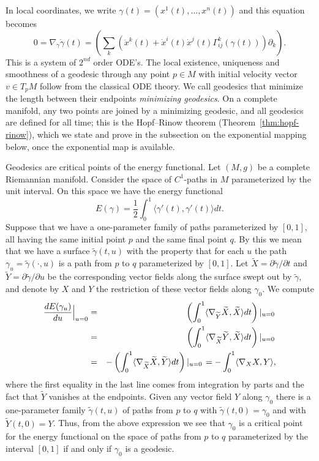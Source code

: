 In local coordinates, we write $\gamma(t)=(x^1(t),\ldots,x^n(t))$
and this equation becomes
$$0=\nabla_{\dot \gamma}\dot \gamma(t) =
\left(\sum\limits_k\left(\ddot x^k(t) +\dot x^i(t)\dot
x^j(t)\Gamma^{k}_{ij}(\gamma(t))\right)\partial_k\right).$$ This is
a system of $2^{nd}$ order ODE's. The local existence, uniqueness
and smoothness of a geodesic through any point $p\in M$ with initial
velocity vector $v\in T_pM$ follow from the classical ODE theory.
We call geodesics that minimize the length between their endpoints
{\em minimizing geodesics}. On a complete manifold, any two points
are joined by a minimizing geodesic, and all geodesics are defined
for all time; this is the Hopf--Rinow theorem
(Theorem~\ref{thm:hopf-rinow}), which we state and prove in the
subsection on the exponential mapping below, once the exponential
map is available.


Geodesics are critical points of the energy functional. Let $(M,g)$
be a complete Riemannian manifold. Consider the space of $C^1$-paths
in $M$ parameterized by the unit interval. On this space we have the
energy functional
$$E(\gamma)=\frac{1}{2}\int_{0}^{1}\langle \gamma'(t),\gamma'(t)\rangle dt.$$
 Suppose that we have a one-parameter family of  paths parameterized by
 $[0,1]$,
 all having the same initial point $p$ and the same final point $q$.
 By this we mean that we have a surface $\tilde\gamma(t,u)$ with the property that for each
 $u$ the path $\gamma_u=\tilde\gamma(\cdot,u)$ is a path from $p$ to $q$ parameterized by $[0,1]$.
 Let $\widetilde X=\partial\tilde \gamma/\partial t$ and
 $\widetilde Y=\partial\tilde \gamma/\partial u$ be the corresponding vector
 fields along the surface swept out by $\tilde \gamma$, and denote by $X$ and $Y$ the restriction
 of these vector fields along $\gamma_0$.
 We compute
 \begin{eqnarray*}
 \frac{dE(\gamma_u)}{du}\Bigl|_{u=0}\Bigr.& = & \left( \int_0^1\langle \nabla_{\widetilde Y}\widetilde X,\widetilde
 X\rangle dt\right)\left|_{u=0}\right. \\
 & = & \left(\int_0^1\langle\nabla_{\widetilde X}\widetilde Y,\widetilde
 X\rangle dt \right)\left|_{u=0}\right.\\
 & = & -\left( \int_0^1\langle\nabla_{\widetilde X}\widetilde X,\widetilde
 Y\rangle dt\right)\left|_{u=0}\right.=-\int_0^1\langle\nabla_XX,Y\rangle,
\end{eqnarray*}
where the first equality in the last line comes from integration by
parts and the fact that $\widetilde Y$ vanishes at the endpoints.
Given any vector field $Y$ along $\gamma_0$ there is a one-parameter
family $\tilde \gamma(t,u)$ of paths from $p$ to $q$ with $\tilde
\gamma(t,0)=\gamma_0$ and with $\widetilde Y(t,0)=Y$. Thus, from the
above expression we see that $\gamma_0$ is a critical point for the
energy functional on the space of paths from $p$ to $q$
parameterized by the interval $[0,1]$ if and only if $\gamma_0$ is a
geodesic.


